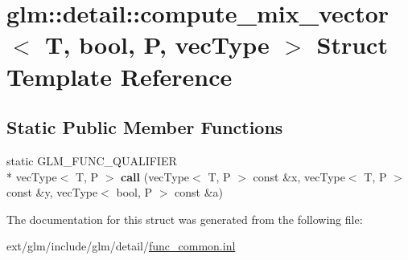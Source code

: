 \hypertarget{structglm_1_1detail_1_1compute__mix__vector_3_01_t_00_01bool_00_01_p_00_01vec_type_01_4}{\section{glm\-:\-:detail\-:\-:compute\-\_\-mix\-\_\-vector$<$ T, bool, P, vec\-Type $>$ Struct Template Reference}
\label{structglm_1_1detail_1_1compute__mix__vector_3_01_t_00_01bool_00_01_p_00_01vec_type_01_4}
}
\subsection*{Static Public Member Functions}
\begin{DoxyCompactItemize}
\item 
\hypertarget{structglm_1_1detail_1_1compute__mix__vector_3_01_t_00_01bool_00_01_p_00_01vec_type_01_4_a8c1f32466902b61e306585f11d903212}{static G\-L\-M\-\_\-\-F\-U\-N\-C\-\_\-\-Q\-U\-A\-L\-I\-F\-I\-E\-R \\*
vec\-Type$<$ T, P $>$ {\bfseries call} (vec\-Type$<$ T, P $>$ const \&x, vec\-Type$<$ T, P $>$ const \&y, vec\-Type$<$ bool, P $>$ const \&a)}\label{structglm_1_1detail_1_1compute__mix__vector_3_01_t_00_01bool_00_01_p_00_01vec_type_01_4_a8c1f32466902b61e306585f11d903212}

\end{DoxyCompactItemize}


The documentation for this struct was generated from the following file\-:\begin{DoxyCompactItemize}
\item 
ext/glm/include/glm/detail/\hyperlink{func__common_8inl}{func\-\_\-common.\-inl}\end{DoxyCompactItemize}
